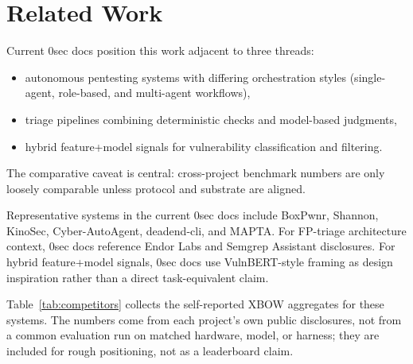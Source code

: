 \documentclass[11pt]{article}
\begin{document}
\section{Related Work}

Current 0sec docs position this work adjacent to three threads:

\begin{itemize}
  \item autonomous pentesting systems with differing orchestration styles
  (single-agent, role-based, and multi-agent workflows),
  \item triage pipelines combining deterministic checks and model-based
  judgments,
  \item hybrid feature+model signals for vulnerability classification and
  filtering.
\end{itemize}

The comparative caveat is central: cross-project benchmark numbers are only
loosely comparable unless protocol and substrate are aligned.

Representative systems in the current 0sec docs include BoxPwnr, Shannon,
KinoSec, Cyber-AutoAgent, deadend-cli, and
MAPTA\citep{boxpwnr,shannon,kinosec,cyberautoagent,deadend,mapta}.
For FP-triage architecture context, 0sec docs reference Endor Labs and
Semgrep Assistant disclosures\citep{endor,semgrep}. For hybrid feature+model
signals, 0sec docs use VulnBERT-style framing as design inspiration rather
than a direct task-equivalent claim\citep{vulnbert}.

Table~\ref{tab:competitors} collects the self-reported XBOW aggregates for
these systems. The numbers come from each project's own public disclosures,
not from a common evaluation run on matched hardware, model, or harness; they
are included for rough positioning, not as a leaderboard claim.
\end{document}
